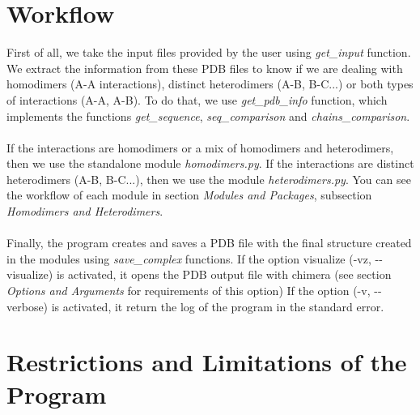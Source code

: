 \documentclass[a4paper,10pt]{report}
\begin{document}
\section{Workflow}

First of all, we take the input files provided by the user using \textit{get\_input} function. We extract the information from these PDB files to know if we are dealing with homodimers (A-A interactions), distinct heterodimers (A-B, B-C...) or both types of interactions (A-A, A-B). To do that, we use \textit{get\_pdb\_info} function, which implements the functions \textit{get\_sequence}, \textit{seq\_comparison} and \textit{chains\_comparison}.\\\\
If the interactions are homodimers or a mix of homodimers and heterodimers, then we use the standalone module \textit{homodimers.py}. If the interactions are distinct heterodimers (A-B, B-C...), then we use the module \textit{heterodimers.py}. You can see the workflow of each module in section \textit{Modules and Packages}, subsection \textit{Homodimers and Heterodimers}.\\\\
Finally, the program creates and saves a PDB file with the final structure created in the modules using \textit{save\_complex} functions. If the option visualize (-vz, -{}-visualize) is activated, it opens the PDB output file with chimera (see section \textit{Options and Arguments} for requirements of this option) If the option (-v, -{}-verbose) is activated, it return the log of the program in the standard error.


\section{Restrictions and Limitations of the Program}
\end{document}
